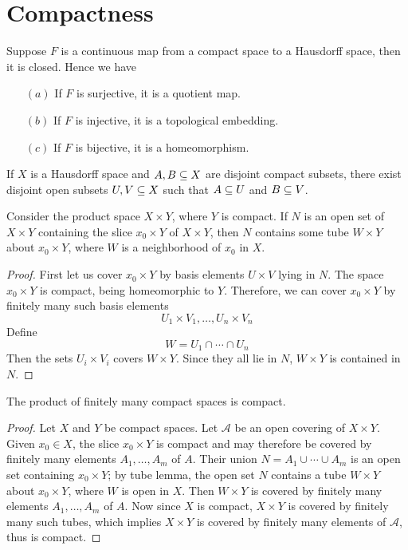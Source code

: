 \section{Compactness}
\begin{theorem}\label{closed map lem}
Suppose $F$ is a continuous map from a compact space to a Hausdorff space, then it is closed. Hence we have 
\begin{itemize}
\item[$(a)$]If $F$ is surjective, it is a quotient map.
\item[$(b)$]If $F$ is injective, it is a topological embedding.
\item[$(c)$]If $F$ is bijective, it is a homeomorphism.
\end{itemize}
\end{theorem}
\begin{lemma}
If $X$ is a Hausdorff space and $A,B\subseteq X$ are disjoint compact subsets, there exist disjoint open subsets $U,V\subseteq X$ such that $A\subseteq U$ and $B\subseteq V$.
\end{lemma}
\begin{lemma}
Consider the product space $X\times Y$, where $Y$ is compact. If $N$ is an open set of $X\times Y$ containing the slice $x_0\times Y$ of $X\times Y$, then $N$ contains some tube $W\times Y$ about $x_0\times Y$, where $W$ is a neighborhood of $x_0$ in $X$.
\end{lemma}
\begin{proof}
First let us cover $x_0\times Y$ by basis elements $U\times V$ lying in $N$. The space $x_0\times Y$ is compact, being homeomorphic to $Y$. Therefore, we can cover $x_0\times Y$ by finitely many such basis elements
\[U_1\times V_1,\dots,U_n\times V_n\]
Define
\[W=U_1\cap\cdots\cap U_n\]
Then the sets $U_i\times V_i$ covers $W\times Y$. Since they all lie in $N$, $W\times Y$ is contained in $N$.
\end{proof}
\begin{theorem}
The product of finitely many compact spaces is compact.
\end{theorem}
\begin{proof}
Let $X$ and $Y$ be compact spaces. Let $\mathcal{A}$ be an open covering of $X\times Y$. Given $x_0\in X$, the slice $x_0\times Y$ is compact and may therefore be covered by finitely many elements $A_1,\dots,A_m$ of $A$. Their union $N=A_1\cup\cdots\cup A_m$ is an open set containing $x_0\times Y$; by tube lemma, the open set $N$ contains a tube $W\times Y$ about $x_0\times Y$, where $W$ is open in $X$. Then $W\times Y$ is covered by finitely many elements $A_1,\dots,A_m$ of $A$. Now since $X$ is compact, $X\times Y$ is covered by finitely many such tubes, which implies $X\times Y$ is covered by finitely many elements of $\mathcal{A}$, thus is compact.
\end{proof}
